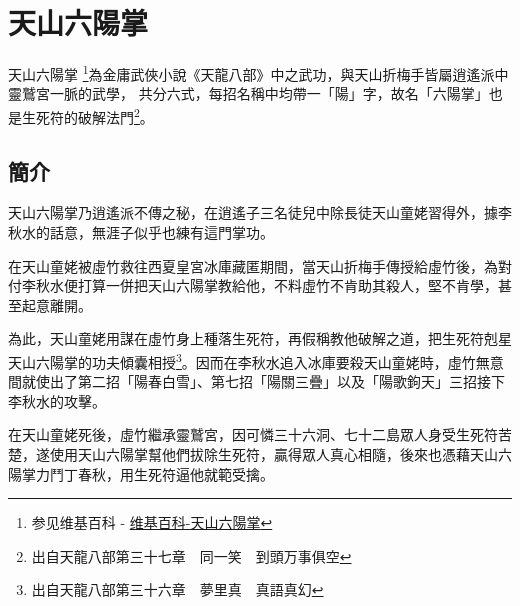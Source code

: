 \chapter{天山六陽掌}
天山六陽掌
\footnote{参见维基百科 - \href{http://zh.wikipedia.org/wiki/\%E5\%A4\%A9\%E5\%B1\%B1\%E5\%85\%AD\%E9\%99\%BD\%E6\%8E\%8C}{
    维基百科-天山六陽掌}}為金庸武俠小說《天龍八部》中之武功，與天山折梅手皆屬逍遙派中靈鷲宮一脈的武學，
共分六式，每招名稱中均帶一「陽」字，故名「六陽掌」也是生死符的破解法門\footnote{出自天龍八部第三十七章　同一笑　到頭万事俱空}。

\section{簡介}
天山六陽掌乃逍遙派不傳之秘，在逍遙子三名徒兒中除長徒天山童姥習得外，據李秋水的話意，無涯子似乎也練有這門掌功。

在天山童姥被虛竹救往西夏皇宮冰庫藏匿期間，當天山折梅手傳授給虛竹後，為對付李秋水便打算一併把天山六陽掌教給他，不料虛竹不肯助其殺人，堅不肯學，甚至起意離開。

為此，天山童姥用謀在虛竹身上種落生死符，再假稱教他破解之道，把生死符剋星天山六陽掌的功夫傾囊相授\footnote{出自天龍八部第三十六章　夢里真　真語真幻}。因而在李秋水追入冰庫要殺天山童姥時，虛竹無意間就使出了第二招「陽春白雪」、第七招「陽關三疊」以及「陽歌鉤天」三招接下李秋水的攻擊。

在天山童姥死後，虛竹繼承靈鷲宮，因可憐三十六洞、七十二島眾人身受生死符苦楚，遂使用天山六陽掌幫他們拔除生死符，贏得眾人真心相隨，後來也憑藉天山六陽掌力鬥丁春秋，用生死符逼他就範受擒。

